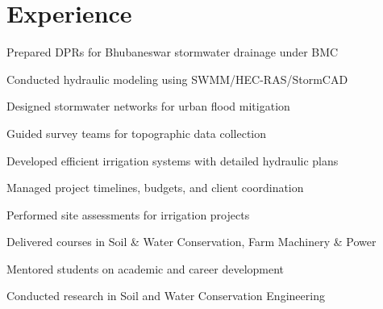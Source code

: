 \documentclass[]{deedy-resume-openfont}
\begin{document}
\begin{minipage}[t]{0.66\textwidth} 


\section{Experience}
\vspace{\topsep} %
\begin{tightemize}
\item Prepared DPRs for Bhubaneswar stormwater drainage under BMC
\item Conducted hydraulic modeling using SWMM/HEC-RAS/StormCAD
\item Designed stormwater networks for urban flood mitigation
\item Guided survey teams for topographic data collection
\end{tightemize}
\sectionsep

\begin{tightemize}
\item Developed efficient irrigation systems with detailed hydraulic plans
\item Managed project timelines, budgets, and client coordination
\item Performed site assessments for irrigation projects
\end{tightemize}
\sectionsep

\begin{tightemize}
\item Delivered courses in Soil \& Water Conservation, Farm Machinery \& Power
\item Mentored students on academic and career development
\item Conducted research in Soil and Water Conservation Engineering
\end{tightemize}
\sectionsep



\end{minipage}
\end{document}
